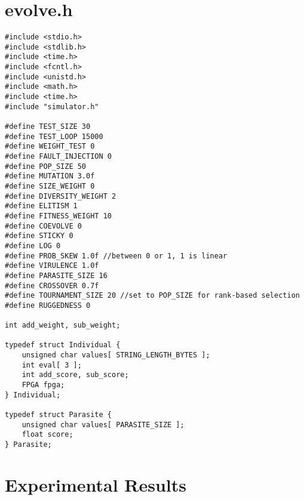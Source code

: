 \documentclass[ %
                    author={Alexander Dalton},
                supervisor={Prof. Seth Bullock},
                    degree={MEng},
                     title={Exploring Evolutionary Hardware:},
                  subtitle={Evolved Binary Arithmetic Circuits and Dynamic Problems},
                      type={research},
                      year={2018} ]{dissertation}
\begin{document}
\label{appx:sim}

\chapter{evolve.h}
\label{appx:evolve}
\begin{lstlisting}
#include <stdio.h>
#include <stdlib.h>
#include <time.h>
#include <fcntl.h>
#include <unistd.h>
#include <math.h>
#include <time.h>
#include "simulator.h"

#define TEST_SIZE 30
#define TEST_LOOP 15000
#define WEIGHT_TEST 0
#define FAULT_INJECTION 0
#define POP_SIZE 50
#define MUTATION 3.0f
#define SIZE_WEIGHT 0
#define DIVERSITY_WEIGHT 2
#define ELITISM 1
#define FITNESS_WEIGHT 10
#define COEVOLVE 0
#define STICKY 0
#define LOG 0
#define PROB_SKEW 1.0f //between 0 or 1, 1 is linear
#define VIRULENCE 1.0f
#define PARASITE_SIZE 16
#define CROSSOVER 0.7f
#define TOURNAMENT_SIZE 20 //set to POP_SIZE for rank-based selection
#define RUGGEDNESS 0

int add_weight, sub_weight;

typedef struct Individual {
	unsigned char values[ STRING_LENGTH_BYTES ];
	int eval[ 3 ];
	int add_score, sub_score;
	FPGA fpga;
} Individual;

typedef struct Parasite {
	unsigned char values[ PARASITE_SIZE ];
	float score;
} Parasite;
\end{lstlisting}

\chapter{Experimental Results}
\label{appx:results}
\end{document}
